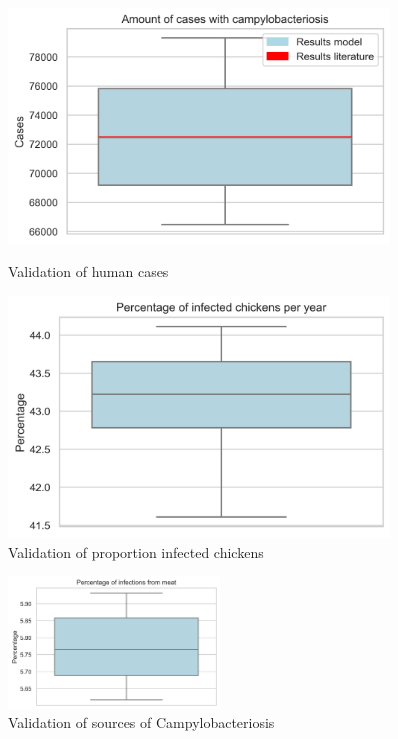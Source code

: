 \begin{figure}[!h]
    \centering
    \begin{minipage}{0.45\textwidth}
        \centering
        \includegraphics[width=0.9\textwidth]{notebooks/human_cases2.png} %
        \caption{Validation of human cases}
        \label{fig:val_human_cases}
    \end{minipage}\hfill
    \begin{minipage}{0.45\textwidth}
        \centering
        \includegraphics[width=0.9\textwidth]{notebooks/chickens2.png} %
        \caption{Validation of proportion infected chickens}
	    \label{fig:val_chickens}
    \end{minipage}
\end{figure}

\begin{figure}[!h]
	\centering
	\includegraphics[width=0.5\textwidth]{notebooks/source2.png}
	\caption{Validation of sources of Campylobacteriosis}
	\label{fig:val_sources}
\end{figure}

